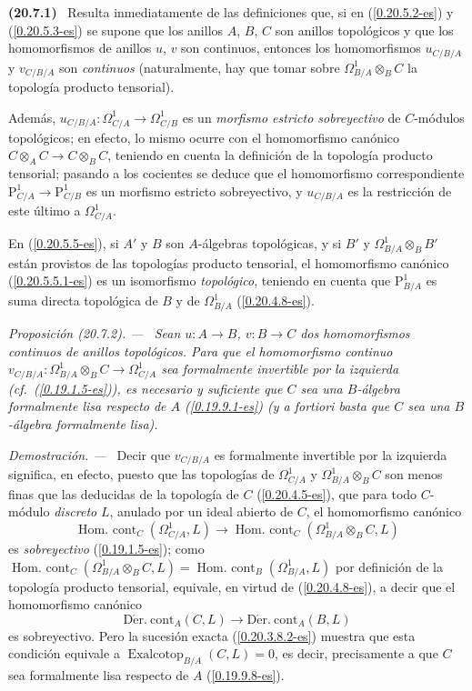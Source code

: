 \documentclass[10pt,oneside]{book}
\makeatletter
\newcommand{\sref}[1]{\textup{(\ref{#1})}}
\newcommand{\setmanualcurrentlabel}[1]{\def\@currentlabel{#1}}
\newcommand{\oldpage}[2][]{%
  \setcounter{footnote}{0}%
  \marginpar{\scriptsize\textbf{#1}~|~#2}\ignorespaces}
\newenvironment{env}[1][]{\setmanualcurrentlabel{#1}\par\medskip\noindent\textbf{(#1)}\ }{\par}
\newenvironment{proposition}[1][]{%
  \setmanualcurrentlabel{#1}\par\medskip\noindent\itshape Proposición (#1). ---\ }{\par}
\newenvironment{proof}{%
  \par\medskip\noindent\textit{Demostración. ---\ }}{\par}
\makeatother
\begin{document}
\begin{env}[20.7.1]
\label{0.20.7.1-es}
Resulta inmediatamente de las definiciones que, si en \sref{0.20.5.2-es} y
\sref{0.20.5.3-es} se supone que los anillos $A$, $B$, $C$ son anillos
topológicos y que los homomorfismos de anillos $u$, $v$ son continuos, entonces los
homomorfismos $u_{C/B/A}$ y $v_{C/B/A}$ son \emph{continuos} (naturalmente,
hay que tomar sobre $\Omega^1_{B/A}\otimes_B C$ la topología producto
tensorial).

Además, $u_{C/B/A}:\Omega^1_{C/A}\to\Omega^1_{C/B}$ es un
\emph{morfismo estricto sobreyectivo} de $C$-módulos topológicos; en efecto, lo
mismo ocurre con el homomorfismo canónico $C\otimes_A C\to C\otimes_B C$, teniendo
en cuenta la definición de la topología producto tensorial; pasando a los
cocientes se deduce que el homomorfismo correspondiente
$\mathrm{P}^1_{C/A}\to\mathrm{P}^1_{C/B}$ es un morfismo estricto sobreyectivo,
y $u_{C/B/A}$ es la restricción de este último a $\Omega^1_{C/A}$.

En \sref{0.20.5.5-es}, si $A'$ y $B$ son $A$-álgebras topológicas,
y si $B'$ y $\Omega^1_{B/A}\otimes_B B'$ están provistos de las topologías producto
tensorial, el homomorfismo canónico \sref{0.20.5.5.1-es} es un isomorfismo
\emph{topológico}, teniendo en cuenta que $\mathrm{P}^1_{B/A}$ es suma directa
topológica de $B$ y de $\Omega^1_{B/A}$ \sref{0.20.4.8-es}.
\end{env}

\begin{proposition}[20.7.2]
\label{0.20.7.2-es}
Sean $u:A\to B$, $v:B\to C$ dos homomorfismos continuos de anillos
topológicos. Para que el homomorfismo continuo
$v_{C/B/A}:\Omega^1_{B/A}\otimes_B C\to\Omega^1_{C/A}$ sea formalmente
invertible por la izquierda \textup{(cf.\ \sref{0.19.1.5-es})}, es necesario y suficiente que $C$
sea una $B$-álgebra formalmente lisa respecto de $A$
\sref{0.19.9.1-es} \textup{(y} a fortiori \textup{basta que $C$ sea una
$B$-álgebra formalmente lisa)}.
\end{proposition}

\begin{proof}
Decir que $v_{C/B/A}$ es formalmente invertible por la izquierda significa, en efecto,
puesto que las topologías de $\Omega^1_{C/A}$ y $\Omega^1_{B/A}\otimes_B C$
son menos finas que las deducidas de la topología de $C$
\sref{0.20.4.5-es}, que para todo $C$-módulo \emph{discreto} $L$, anulado por un
ideal abierto de $C$, el homomorfismo canónico
\[
  \operatorname{Hom.\ cont}_C(\Omega^1_{C/A},L)\to
  \operatorname{Hom.\ cont}_C(\Omega^1_{B/A}\otimes_B C,L)
\]
\oldpage[0\textsubscript{IV-1}]{148}
es \emph{sobreyectivo} \sref{0.19.1.5-es}; como
$\operatorname{Hom.\ cont}_C(\Omega^1_{B/A}\otimes_B C,L)=
\operatorname{Hom.\ cont}_B(\Omega^1_{B/A},L)$ por definición de la topología
producto tensorial, equivale, en virtud de \sref{0.20.4.8-es}, a decir
que el homomorfismo canónico
\[
  \operatorname{D\acute{e}r.\ cont}_A(C,L)\to
  \operatorname{D\acute{e}r.\ cont}_A(B,L)
\]
es sobreyectivo. Pero la sucesión exacta \sref{0.20.3.8.2-es} muestra que esta
condición equivale a $\operatorname{Exalcotop}_{B/A}(C,L)=0$, es decir,
precisamente a que $C$ sea formalmente lisa respecto de $A$
\sref{0.19.9.8-es}.
\end{proof}
\end{document}
